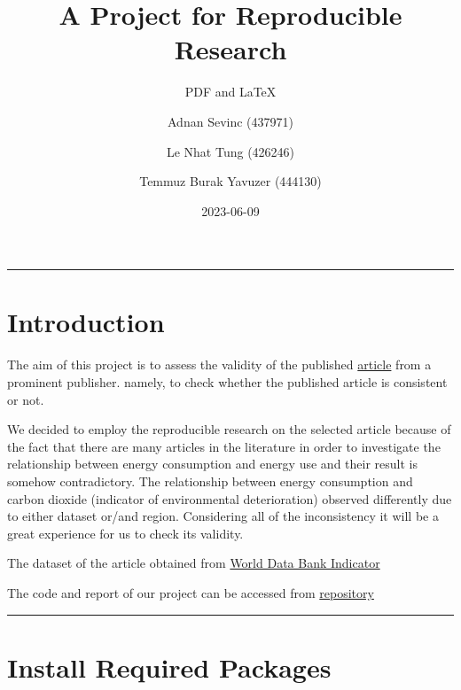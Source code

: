 \documentclass[
  11pt,
]{article}
\title{A Project for Reproducible Research}
\subtitle{PDF and LaTeX}
\author{Adnan Sevinc (437971) \and Le Nhat Tung (426246) \and Temmuz
Burak Yavuzer (444130)}
\date{2023-06-09}
\begin{document}
\maketitle
\ifdefined\Shaded\renewenvironment{Shaded}{\begin{tcolorbox}[boxrule=0pt, interior hidden, borderline west={3pt}{0pt}{shadecolor}, enhanced, frame hidden, breakable, sharp corners]}{\end{tcolorbox}}\fi

\begin{center}\rule{0.5\linewidth}{0.5pt}\end{center}

\hypertarget{introduction}{%
\section{Introduction}\label{introduction}}

The aim of this project is to assess the validity of the published
\href{https://www.sciencedirect.com/science/article/abs/pii/S1364032116000848}{article}
from a prominent publisher. namely, to check whether the published
article is consistent or not.

We decided to employ the reproducible research on the selected article
because of the fact that there are many articles in the literature in
order to investigate the relationship between energy consumption and
energy use and their result is somehow contradictory. The relationship
between energy consumption and carbon dioxide (indicator of
environmental deterioration) observed differently due to either dataset
or/and region. Considering all of the inconsistency it will be a great
experience for us to check its validity.

The dataset of the article obtained from
\href{http://data.worldbank.org/indicator}{World Data Bank Indicator}

The code and report of our project can be accessed from
\href{https://github.com/lenhattung/RRProject_426246_437971_444130.git}{repository}

\begin{center}\rule{0.5\linewidth}{0.5pt}\end{center}

\hypertarget{install-required-packages}{%
\section{Install Required Packages}\label{install-required-packages}}
\end{document}
